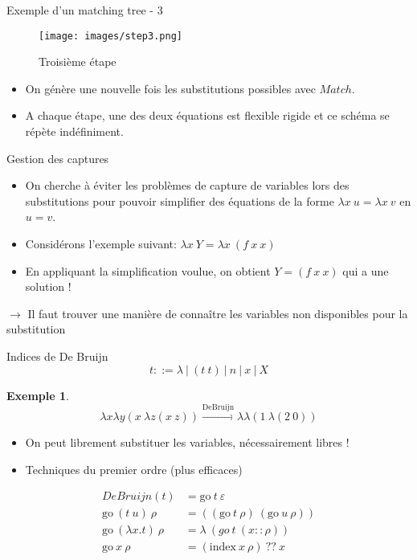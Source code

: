 \documentclass{beamer}
\begin{document}
\begin{frame}{Exemple d'un matching tree - 3}

\begin{minipage}{0.5\textwidth}
\begin{figure}[H]
\texttt{[image: images/step3.png]}
\caption{\label{fig:blue_rectangle2} Troisième étape}
\end{figure}
\end{minipage} \hfill
\begin{minipage}{0.45\textwidth}
\begin{itemize}
\item On génère une nouvelle fois les substitutions possibles avec $Match$.
\item A chaque étape, une des deux équations est flexible rigide et ce schéma se répète indéfiniment.
\end{itemize}
\end{minipage}
\end{frame}


\begin{frame}{Gestion des captures}
\begin{itemize}
    \item On cherche à éviter les problèmes de capture de variables lors des substitutions pour pouvoir simplifier des équations de la forme $\lambda x\ u = \lambda x\ v$ en $u = v$.
    \item Considérons l'exemple suivant: $\lambda x\ Y = \lambda x\ (f\ x\ x)$
    \item En appliquant la simplification voulue, on obtient $Y = (f\ x\ x)$ qui a une solution !
\end{itemize}
\vspace{1\baselineskip}
$\rightarrow$ Il faut trouver une manière de connaître les variables non disponibles pour la substitution 
\end{frame}


\newcommand{\go}{\text{go}}
\newtheorem{exemple}{Exemple}
\begin{frame}{Indices de De Bruijn}
 $$ t ::= \lambda \ | \ (t\ t) \ | \ n \ | \ x \ | \ X$$
\begin{exemple}
    $$\lambda x \lambda y (x\ \lambda z (x\ z)) 
    \xrightarrow{\text{DeBruijn}} 
    \lambda \lambda (1 \ \lambda (2 \ 0))$$
\end{exemple}
\begin{itemize}
    \item On peut librement substituer les variables, nécessairement libres !
    \item Techniques du premier ordre (plus efficaces)
\end{itemize}
\begin{align*}
     DeBruijn(t) &= \go \ t \ \varepsilon \\
     \go \ (t \ u) \ \rho &= ((\go \ t \ \rho) \ (\go \ u \ \rho)) \\
     \go \ (\lambda x. t) \ \rho &= \lambda \ (go \ t \ (x :: \rho)) \\
     \go \ x \ \rho &= (\text{index} \ x \ \rho) \ ?? \ x \\
 \end{align*}
\end{frame}
\end{document}
